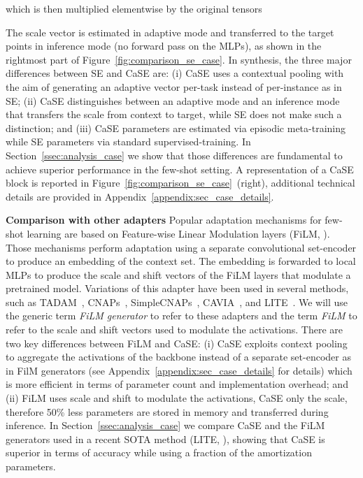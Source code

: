 \documentclass{article}
\begin{document}
which is then multiplied elementwise by the original tensors

The scale vector is estimated in adaptive mode and transferred to the target points  in inference mode (no forward pass on the MLPs), as shown in the rightmost part of Figure~\ref{fig:comparison_se_case}. In synthesis, the three major differences between SE and CaSE are: (i) CaSE uses a contextual pooling with the aim of generating an adaptive vector per-task instead of per-instance as in SE; (ii) CaSE distinguishes between an adaptive mode and an inference mode that transfers the scale from context to target, while SE does not make such a distinction; and (iii) CaSE parameters are estimated via episodic meta-training while SE parameters via standard supervised-training.
In Section~\ref{ssec:analysis_case} we show that those differences are fundamental to achieve superior performance in the few-shot setting.
A representation of a CaSE block is reported in Figure~\ref{fig:comparison_se_case}~(right), additional technical details are provided in Appendix~\ref{appendix:sec_case_details}.

\textbf{Comparison with other adapters} Popular adaptation mechanisms for few-shot learning are based on Feature-wise Linear Modulation layers (FiLM, \citealt{perez2018film}). Those mechanisms perform adaptation using a separate convolutional set-encoder to produce an embedding of the context set. The embedding is forwarded to local MLPs to produce the scale and shift vectors of the FiLM layers that modulate a pretrained model. Variations of this adapter have been used in several methods, such as TADAM~\citep{oreshkin2018tadam}, CNAPs~\citep{requeima2019fast}, SimpleCNAPs~\citep{bateni2020improved}, CAVIA~\citep{zintgraf2019fast}, and LITE~\citep{bronskill2021memory}. We will use the generic term \emph{FiLM generator} to refer to these adapters and the term \emph{FiLM} to refer to the scale and shift vectors used to modulate the activations.
There are two key differences between FiLM and CaSE: (i) CaSE exploits context pooling to aggregate the activations of the backbone instead of a separate set-encoder as in FilM generators (see Appendix~\ref{appendix:sec_case_details} for details) which is more efficient in terms of parameter count and implementation overhead; and (ii) FiLM uses scale and shift to modulate the activations, CaSE only the scale, therefore 50\% less parameters are stored in memory and transferred during inference.
In Section~\ref{ssec:analysis_case} we compare CaSE and the FiLM generators used in a recent SOTA method (LITE, \citealt{bronskill2021memory}), showing that CaSE is superior in terms of accuracy while using a fraction of the amortization parameters.
\end{document}
